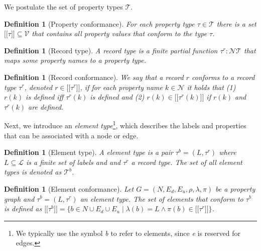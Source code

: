 \documentclass[a4paper]{article}
\makeatletter
\newtheorem{definition}[theorem]{Definition}
\newcommand{\pto}{}%
\DeclareRobustCommand{\pto}{\mathrel{\mathpalette\p@to@gets\to}}
\newcommand{\p@to@gets}[2]{%
  \ooalign{\hidewidth$\m@th#1\mapstochar\mkern5mu$\hidewidth\cr$\m@th#1\to$\cr}%
}
\newcommand{\ptype}{\tau}
\newcommand{\ptypes}{\mathcal{T}}
\newcommand{\rtype}{\tau^r}
\newcommand{\btype}{\tau^b}
\newcommand{\btypes}{\mathcal{T}^b}
\newcommand{\lsem}{\ensuremath{[\![}}
\newcommand{\rsem}{\ensuremath{]\!]}}
\newcommand{\sem}[1]{\ensuremath{\lsem #1 \rsem}}
\makeatother
\begin{document}
We postulate the set of property types $\mathcal{T}$.

\begin{definition}[Property conformance]
  For each property type $\ptype \in \ptypes$ there is a set $\sem{\ptype} \subseteq \mathcal{V}$ that contains all property values that \emph{conform} to the type $\ptype$.
\end{definition}

\begin{definition}[Record type]
  A \emph{record type} is a finite partial function $\rtype : \mathcal{N} \pto \ptypes$ that maps some property names to a property type.
\end{definition}

\begin{definition}[Record conformance]
  We say that a record $r$ \emph{conforms} to a record type $\rtype$, denoted $r \in \sem{\rtype}$, if for each property name $k \in \mathcal{N}$ it holds that (1) $r(k)$ is defined iff $\rtype(k)$ is defined and (2) $r(k) \in \sem{\rtype(k)}$ if $r(k)$ and $\rtype(k)$ are defined.
\end{definition}

Next, we introduce an \emph{element type}\footnote{We typically use the symbol \emph{b} to refer to elements, since \emph{e} is reserved for edges.}, which describes the labels and properties that can be associated with a node or edge.

\begin{definition}[Element type]
  A \emph{element type} is a pair $\btype = (L, \rtype)$ where $L \subseteq \mathcal{L}$ is a finite set of labels and and $\rtype$ a record type. 
  The set of all element types is denoted as $\btypes$.
\end{definition}

\begin{definition}[Element conformance]
  Let $G = (N, E_d, E_u, \rho, \lambda, \pi)$ be a property graph and $\btype = (L, \rtype)$ an element type. The set of elements that \emph{conform} to $\btype$ is defined as $\sem{\btype} = \{b \in N \cup E_d \cup E_u \mid \lambda(b) = L \wedge \pi(b) \in \sem{\rtype}\}$.
\end{definition}
\end{document}
